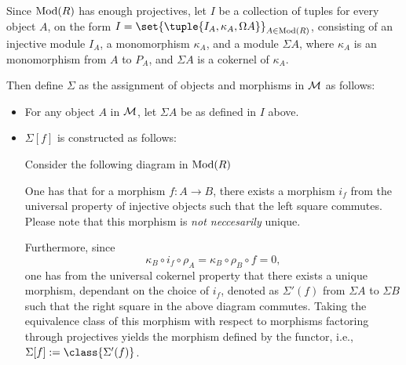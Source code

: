 \begin{definition}
    \label{def:stmod_sigma}
    Since \( \operatorname{Mod}(R) \) has enough projectives, let \( I \) be a collection of tuples for every object \( A \), on the form \( I = \set{\tuple{I_A, \kappa_A, \Omega A}}_{A \in \Mod(R)} \), consisting of an injective module \( I_A \), a monomorphism \( \kappa_A \), and a module \( \Sigma A \), where \( \kappa_A \) is an monomorphism from \( A \) to \( P_A \), and \( \Sigma A \) is a cokernel of \( \kappa_A \).

    Then define \( \Sigma \) as the assignment of objects and morphisms in \( {\mathcal{M}} \) as follows:
    \begin{itemize}
        \item {
            For any object \( A \) in \( {\mathcal{M}} \), let \( \Sigma A \) be as defined in \( I \) above.
        }
        \item {
            \( \Sigma [f] \) is constructed as follows:

            Consider the following diagram in \( \operatorname{Mod}(R) \)
            \begin{center}
            \end{center}

            One has that for a morphism \( f: A \to B \), there exists a morphism \( i_f \) from the universal property of injective objects such that the left square commutes. Please note that this morphism is \emph{not neccesarily} unique.

            Furthermore, since
            \[
                \kappa_B \circ i_f \circ \rho_A = \kappa_B \circ \rho_B \circ f = 0,
            \]
            one has from the universal cokernel property that there exists a unique morphism, dependant on the choice of \( i_f \), denoted as \( \Sigma'(f) \) from \( \Sigma A \) to \( \Sigma B \) such that the right square in the above diagram commutes. Taking the equivalence class of this morphism with respect to morphisms factoring through projectives yields the morphism defined by the functor, i.e., \( \Sigma [f] := \class{\Sigma'(f)} \).
        }
    \end{itemize}
\end{definition}


